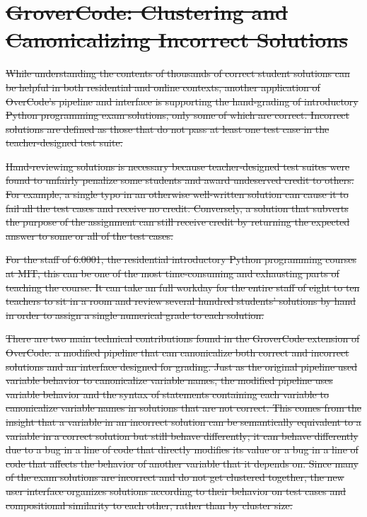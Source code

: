 \documentclass[12pt,twoside]{mitthesis}
\providecommand{\DIFdeltex}[1]{{\protect\color{red}\sout{#1}}}                      %
\providecommand{\DIFdel}[1]{\texorpdfstring{\DIFdeltex{#1}}{}} %
\begin{document}
{{{{{{{{{{%
\section{\DIFdel{GroverCode: Clustering and Canonicalizing Incorrect Solutions}}%
\addtocounter{section}{-1}%

\DIFdel{While understanding the contents of thousands of correct student solutions can be helpful in both residential and online contexts, another application of OverCode's pipeline and interface is supporting the hand-grading of introductory Python programming exam solutions, only some of which are correct. Incorrect solutions are defined as those that do not pass at least one test case in the teacher-designed test suite.
}%

\DIFdel{Hand-reviewing solutions is necessary because teacher-designed test suites were found to unfairly penalize some students and award undeserved credit to others. For example, a single typo in an otherwise well-written solution can cause it to fail all the test cases and receive no credit. Conversely, a solution that subverts the purpose of the assignment can still receive credit by returning the expected answer to some or all of the test cases.
}%

\DIFdel{For the staff of 6.0001, the residential introductory Python programming courses at MIT, this can be one of the most time-consuming and exhausting parts of teaching the course. It can take an full workday for the entire staff of eight to ten teachers to sit in a room and review several hundred students' solutions by hand in order to assign a single numerical grade to each solution. 
}%

\DIFdel{There are two main technical contributions found in the GroverCode extension of OverCode: a modified pipeline that can canonicalize both correct and incorrect solutions and an interface designed for grading. Just as the original pipeline used variable behavior to canonicalize variable names, the modified pipeline uses variable behavior and the syntax of statements containing each variable to canonicalize variable names in solutions that are not correct. This comes from the insight that a variable in an incorrect solution can be semantically equivalent to a variable in a correct solution but still behave differently; it can behave differently due to a bug in a line of code that directly modifies its value or a bug in a line of code that affects the behavior of another variable that it depends on. Since many of the exam solutions are incorrect and do not get clustered together, the new user interface organizes solutions according to their behavior on test cases and compositional similarity to each other, rather than by cluster size.
}%

}}}}}}}}}}
\end{document}
